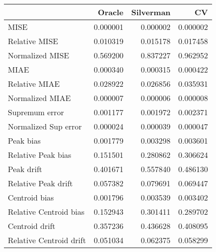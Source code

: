 \begin{tabular}{lrrr}
  \toprule
 & Oracle & Silverman & CV \\ 
  \midrule
MISE & 0.000001 & 0.000002 & 0.000002 \\ 
  Relative MISE & 0.010319 & 0.015178 & 0.017458 \\ 
  Normalized MISE & 0.569200 & 0.837227 & 0.962952 \\ 
  MIAE & 0.000340 & 0.000315 & 0.000422 \\ 
  Relative MIAE & 0.028922 & 0.026856 & 0.035931 \\ 
  Normalized MIAE & 0.000007 & 0.000006 & 0.000008 \\ 
  Supremum error & 0.001177 & 0.001972 & 0.002371 \\ 
  Normalized Sup error & 0.000024 & 0.000039 & 0.000047 \\ 
  Peak bias & 0.001779 & 0.003298 & 0.003601 \\ 
  Relative Peak bias & 0.151501 & 0.280862 & 0.306624 \\ 
  Peak drift & 0.401671 & 0.557840 & 0.486130 \\ 
  Relative Peak drift & 0.057382 & 0.079691 & 0.069447 \\ 
  Centroid bias & 0.001796 & 0.003539 & 0.003402 \\ 
  Relative Centroid bias & 0.152943 & 0.301411 & 0.289702 \\ 
  Centroid drift & 0.357236 & 0.436628 & 0.408095 \\ 
  Relative Centroid drift & 0.051034 & 0.062375 & 0.058299 \\ 
   \bottomrule
\end{tabular}
